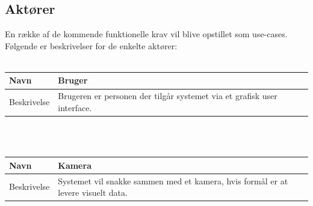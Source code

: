 \documentclass[kravspec.tex]{subfiles}
\begin{document}
\subsection{Aktører}
En række af de kommende funktionelle krav vil blive opstillet som use-cases. Følgende er beskrivelser for de enkelte aktører: \\
\\
\begin{tabular}{| l | p{10cm} |}
	\hline 
	Navn & Bruger \\ \hline
	Beskrivelse & Brugeren er personen der tilgår systemet via et grafisk user interface.\\ \hline
\end{tabular}
\\ \\
\begin{tabular}{| l | p{10cm} |}
	\hline 
	Navn & Kamera \\ \hline
	Beskrivelse & Systemet vil snakke sammen med et kamera, hvis formål er at levere visuelt data.\\ \hline
\end{tabular}
\end{document}
